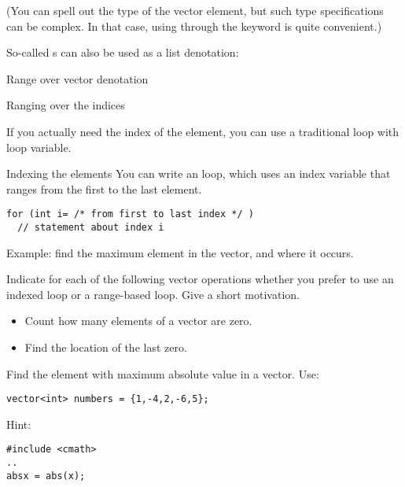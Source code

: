 (You can spell out the type of the vector element, but such type
specifications can be complex.
In that case, using 
through the  keyword
is quite convenient.)

So-called s
can also be used as a list denotation:

\begin{block}{Range over vector denotation}
  \label{sl:range-denote}
\end{block}

 {Ranging over the indices}

If you actually need the index of the element, you can use a
traditional  loop with loop variable.

\begin{block}{Indexing the elements}
  \label{sl:index-range}
  You can write an  loop, which uses an
  index variable that ranges from the first to the last element.
\begin{lstlisting}
for (int i= /* from first to last index */ )
  // statement about index i
\end{lstlisting}
Example: find the maximum element in the vector, and where it occurs.
%
\renewcommand\snippetcodefraction{.67}
\renewcommand\snippetanswfraction{.3}
\end{block}

\begin{exercise}
  \label{ex:range-for}
  Indicate for each of the following vector operations whether you
  prefer to use an indexed loop or a range-based loop. Give a short
  motivation.
  \begin{itemize}
  \item Count how many elements of a vector are zero.
  \item Find the location of the last zero.
  \end{itemize}
\end{exercise}

\begin{exercise}
  \label{ex:array-max}
  Find the element with maximum absolute value in a vector. Use:
\begin{lstlisting}
vector<int> numbers = {1,-4,2,-6,5};
\end{lstlisting}

Hint:
\begin{lstlisting}
#include <cmath>
..
absx = abs(x);
\end{lstlisting}
\end{exercise}

